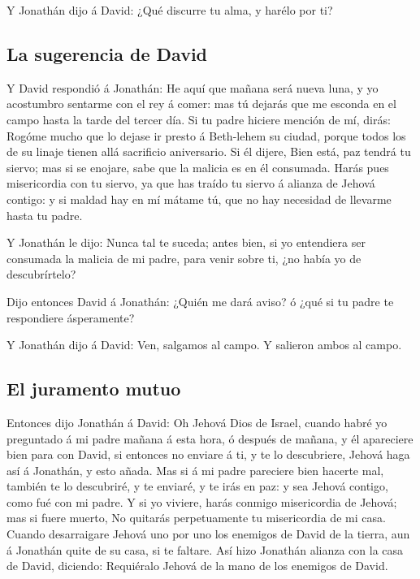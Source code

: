  Y Jonathán dijo á David: ¿Qué discurre tu alma, y harélo
por ti?

\hypertarget{la-sugerencia-de-david}{%
\subsection{La sugerencia de David}\label{la-sugerencia-de-david}}

 Y David respondió á Jonathán: He aquí que mañana será
nueva luna, y yo acostumbro sentarme con el rey á comer: mas tú dejarás
que me esconda en el campo hasta la tarde del tercer día. 
Si tu padre hiciere mención de mí, dirás: Rogóme mucho que lo dejase ir
presto á Beth-lehem su ciudad, porque todos los de su linaje tienen allá
sacrificio aniversario.  Si él dijere, Bien está, paz
tendrá tu siervo; mas si se enojare, sabe que la malicia es en él
consumada.  Harás pues misericordia con tu siervo, ya que
has traído tu siervo á alianza de Jehová contigo: y si maldad hay en mí
mátame tú, que no hay necesidad de llevarme hasta tu padre.

 Y Jonathán le dijo: Nunca tal te suceda; antes bien, si
yo entendiera ser consumada la malicia de mi padre, para venir sobre ti,
¿no había yo de descubrírtelo?

 Dijo entonces David á Jonathán: ¿Quién me dará aviso? ó
¿qué si tu padre te respondiere ásperamente?

 Y Jonathán dijo á David: Ven, salgamos al campo. Y
salieron ambos al campo.

\hypertarget{el-juramento-mutuo}{%
\subsection{El juramento mutuo}\label{el-juramento-mutuo}}

 Entonces dijo Jonathán á David: Oh Jehová Dios de
Israel, cuando habré yo preguntado á mi padre mañana á esta hora, ó
después de mañana, y él apareciere bien para con David, si entonces no
enviare á ti, y te lo descubriere,  Jehová haga así á
Jonathán, y esto añada. Mas si á mi padre pareciere bien hacerte mal,
también te lo descubriré, y te enviaré, y te irás en paz: y sea Jehová
contigo, como fué con mi padre.  Y si yo viviere, harás
conmigo misericordia de Jehová; mas si fuere muerto,  No
quitarás perpetuamente tu misericordia de mi casa. Cuando desarraigare
Jehová uno por uno los enemigos de David de la tierra, aun á Jonathán
quite de su casa, si te faltare.  Así hizo Jonathán
alianza con la casa de David, diciendo: Requiéralo Jehová de la mano de
los enemigos de David.

